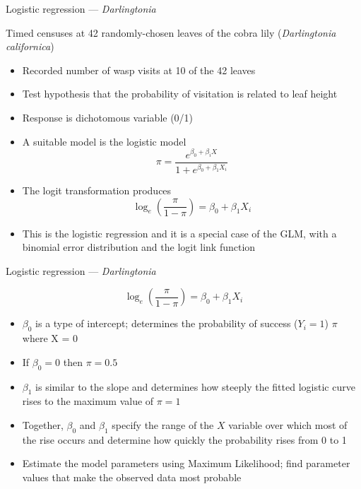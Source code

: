 \documentclass[10pt,ignorenonframetext,compress, aspectratio=169]{beamer}
\providecommand{\tightlist}{%
  \setlength{\itemsep}{0pt}\setlength{\parskip}{0pt}}
\begin{document}
\begin{frame}{Logistic regression --- \emph{Darlingtonia}}

Timed censuses at 42 randomly-chosen leaves of the cobra lily
(\emph{Darlingtonia californica})

\begin{itemize}
\tightlist
\item
  Recorded number of wasp visits at 10 of the 42 leaves
\item
  Test hypothesis that the probability of visitation is related to leaf
  height
\item
  Response is dichotomous variable (0/1)
\item
  A suitable model is the logistic model
  \[\pi = \frac{e^{\beta_0 + \beta_i X}}{1 + e^{\beta_0 + \beta_1 X_i}}\]
\item
  The logit transformation produces
  \[\log_e \left( \frac{\pi}{1-\pi} \right) = \beta_0 + \beta_1 X_i\]
\item
  This is the logistic regression and it is a special case of the GLM,
  with a binomial error distribution and the logit link function
\end{itemize}

\end{frame}

\begin{frame}{Logistic regression --- \emph{Darlingtonia}}

\[\log_e \left( \frac{\pi}{1-\pi} \right) = \beta_0 + \beta_1 X_i\]

\begin{itemize}
\tightlist
\item
  \(\beta_0\) is a type of intercept; determines the probability of
  success (\(Y_i = 1\)) \(\pi\) where X = 0
\item
  If \(\beta_0 = 0\) then \(\pi = 0.5\)
\item
  \(\beta_1\) is similar to the slope and determines how steeply the
  fitted logistic curve rises to the maximum value of \(\pi = 1\)
\item
  Together, \(\beta_0\) and \(\beta_1\) specify the range of the \(X\)
  variable over which most of the rise occurs and determine how quickly
  the probability rises from 0 to 1
\item
  Estimate the model parameters using \alert{Maximum Likelihood}; find
  parameter values that make the observed data most probable
\end{itemize}

\end{frame}
\end{document}
